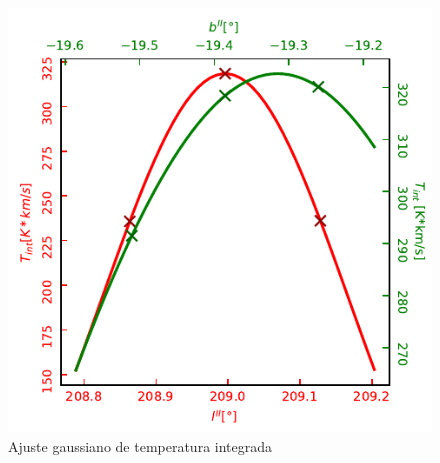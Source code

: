 \begin{figure}[htbp]
	\centering
	\includegraphics{tint.pdf}
	\caption{Ajuste gaussiano de temperatura integrada}
	\label{fig:tint}
\end{figure}